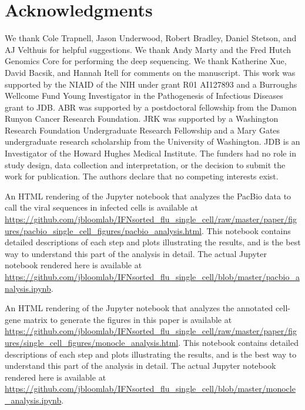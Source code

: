 \documentclass[9pt,lineno]{elife}
\begin{document}
\section{Acknowledgments}
We thank Cole Trapnell, Jason Underwood, Robert Bradley, Daniel Stetson, and AJ Velthuis for helpful suggestions.
We thank Andy Marty and the Fred Hutch Genomics Core for performing the deep sequencing.
We thank Katherine Xue, David Bacsik, and Hannah Itell for comments on the manuscript.
This work was supported by the NIAID of the NIH under grant R01 AI127893 and a Burroughs Wellcome Fund Young Investigator in the Pathogenesis of Infectious Diseases grant to JDB.
ABR was supported by a postdoctoral fellowship from the Damon Runyon Cancer Research Foundation.
JRK was supported by a Washington Research Foundation Undergraduate Research Fellowship and a Mary Gates undergraduate research scholarship from the University of Washington.
JDB is an Investigator of the Howard Hughes Medical Institute.
The funders had no role in study design, data collection and interpretation, or the decision to submit the work for publication.
The authors declare that no competing interests exist.

\nolinenumbers



\clearpage

\begin{suppfile}
\caption{\label{suppfile:pacbio_analysis}
An HTML rendering of the Jupyter notebook that analyzes the PacBio data to call the viral sequences in infected cells is available at \url{https://github.com/jbloomlab/IFNsorted_flu_single_cell/raw/master/paper/figures/pacbio_single_cell_figures/pacbio_analysis.html}.
This notebook contains detailed descriptions of each step and plots illustrating the results, and is the best way to understand this part of the analysis in detail.
The actual Jupyter notebook rendered here is available at \url{https://github.com/jbloomlab/IFNsorted_flu_single_cell/blob/master/pacbio_analysis.ipynb}.}
\end{suppfile}

\begin{suppfile}
\caption{\label{suppfile:monocle_analysis}
An HTML rendering of the Jupyter notebook that analyzes the annotated cell-gene matrix to generate the figures in this paper is available at \url{https://github.com/jbloomlab/IFNsorted_flu_single_cell/raw/master/paper/figures/single_cell_figures/monocle_analysis.html}.
This notebook contains detailed descriptions of each step and plots illustrating the results, and is the best way to understand this part of the analysis in detail.
The actual Jupyter notebook rendered here is available at \url{https://github.com/jbloomlab/IFNsorted_flu_single_cell/blob/master/monocle_analysis.ipynb}.}
\end{suppfile}
\end{document}
